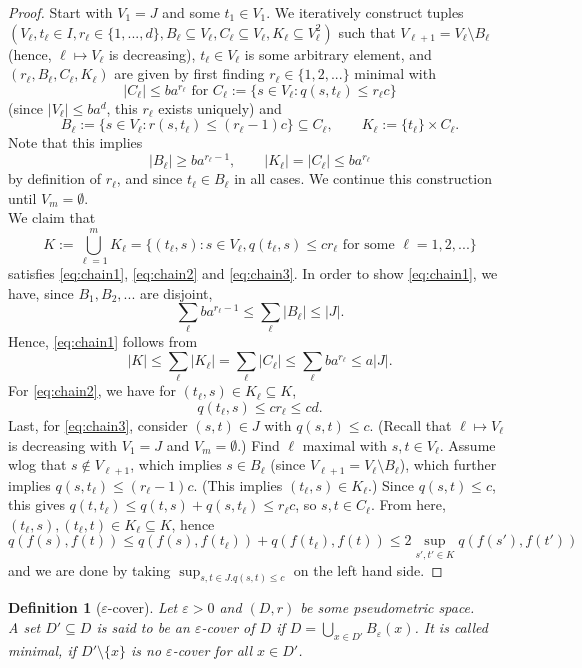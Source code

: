 \documentclass{article}
\newtheorem{definition}[proposition]{Definition}
\theoremstyle{definition}
\theoremstyle{step} \newtheorem{step}{Step}
\begin{document}
\begin{proof}
  Start with $V_1 = J$ and some $t_1 \in V_1$. We iteratively construct tuples $(V_\ell, t_\ell \in I, r_\ell \in \{1,...,d\}, B_\ell \subseteq V_\ell, C_\ell \subseteq V_\ell, K_\ell \subseteq V_\ell^2)$ such that $V_{\ell+1} = V_\ell \setminus B_\ell$ (hence, $\ell \mapsto V_\ell$ is decreasing), $t_\ell \in V_\ell$ is some arbitrary element, and $(r_\ell, B_\ell, C_\ell, K_\ell)$ are given by first finding $r_\ell \in \{1,2,...\}$ minimal with
  $$ |C_\ell| \leq ba^{r_\ell} \text{ for } C_\ell := \{s \in V_\ell: q(s, t_\ell) \leq r_\ell c \}$$
  (since $|V_\ell| \leq ba^d$, this $r_\ell$ exists uniquely) and
  $$ B_\ell := \{s\in V_\ell: r(s,t_\ell) \leq (r_\ell-1)c\} \subseteq C_\ell, \qquad K_\ell := \{t_\ell\} \times C_\ell. $$
  Note that this implies
  $$ |B_\ell| \geq ba^{r_\ell-1}, \qquad |K_\ell| = |C_\ell| \leq ba^{r_\ell} $$
  by definition of $r_\ell$, and since $t_\ell \in B_\ell$ in all cases. We continue this construction until $V_m = \emptyset$.
  \\
  We claim that
  $$ K := \bigcup_{\ell=1}^m K_\ell = \{(t_\ell,s): s \in V_\ell, q(t_\ell,s) \leq cr_\ell \text{ for some } \ell=1,2,...\}$$
  satisfies \eqref{eq:chain1}, \eqref{eq:chain2} and \eqref{eq:chain3}.
  In order to show \eqref{eq:chain1}, we have, since $B_1, B_2,...$ are disjoint,
  $$ \sum_\ell ba^{r_\ell-1} \leq \sum_\ell |B_\ell| \leq |J|.$$
  Hence, \eqref{eq:chain1} follows from
  $$ |K| \leq \sum_\ell |K_\ell| = \sum_\ell |C_\ell| \leq \sum_\ell ba^{r_\ell} \leq a|J|.$$
  For \eqref{eq:chain2}, we have for $(t_\ell,s) \in K_\ell \subseteq K$,
  $$ q(t_\ell, s) \leq cr_\ell \leq cd.$$
  Last, for \eqref{eq:chain3}, consider $(s,t) \in J$ with $q(s,t) \leq c$. (Recall that $\ell \mapsto V_\ell$ is decreasing with $V_1=J$ and $V_m = \emptyset$.) Find $\ell$ maximal with $s,t \in V_\ell$. Assume wlog that $s \notin V_{\ell+1}$, which implies $s \in B_\ell$ (since $V_{\ell+1} = V_\ell \setminus B_\ell$), which further implies $q(s, t_\ell) \leq (r_\ell-1)c$. (This implies $(t_\ell,s) \in K_\ell$.) Since $q(s,t) \leq c$, this gives $q(t, t_\ell) \leq q(t,s) + q(s, t_\ell) \leq r_\ell c$, so $s,t \in C_\ell$. From here, $(t_\ell, s), (t_\ell, t) \in K_\ell \subseteq K$, hence
  $$ q(f(s), f(t)) \leq q(f(s), f(t_\ell)) + q(f(t_\ell), f(t)) \leq 2\sup_{s', t' \in K} q(f(s'), f(t'))$$
  and we are done by taking $\sup_{s,t \in J. q(s,t) \leq c}$ on the left hand side.
\end{proof}


\begin{definition}[$\varepsilon$-cover]
  Let $\varepsilon>0$ and $(D,r)$ be some pseudometric space.\\ A set $D' \subseteq D$ is said to be an $\varepsilon$-cover of $D$ if $D = \bigcup_{x\in D'} B_\varepsilon(x)$. It is called minimal, if $D' \setminus \{x\}$ is no $\varepsilon$-cover for all $x \in D'$.
\end{definition}
\end{document}
